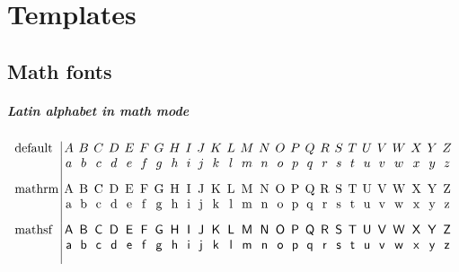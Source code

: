 \chapter{Templates}

\section{Math fonts}
\paragraph*{Latin alphabet in math mode}
\begin{align*}
 \arraycolsep=2pt
 \begin{array}{l|cccccccccccccccccccccccccc}
  \text{default} &
  A & B & C & D & E & F & G & H & I & J & K & L & M & N & O & P & Q & R & S & T & U & V & W & X & Y & Z \\
  \text{} &
  a & b & c & d & e & f & g & h & i & j & k & l & m & n & o & p & q & r & s & t & u & v & w & x & y & z \\[2ex]
  \text{mathrm} &
  \mathrm{A} & \mathrm{B} & \mathrm{C} & \mathrm{D} & \mathrm{E} & \mathrm{F} & \mathrm{G} & \mathrm{H} & \mathrm{I} & \mathrm{J} & \mathrm{K} & \mathrm{L} & \mathrm{M} & \mathrm{N} & \mathrm{O} & \mathrm{P} & \mathrm{Q} & \mathrm{R} & \mathrm{S} & \mathrm{T} & \mathrm{U} & \mathrm{V} & \mathrm{W} & \mathrm{X} & \mathrm{Y} & \mathrm{Z} \\
  \text{} &
  \mathrm{a} & \mathrm{b} & \mathrm{c} & \mathrm{d} & \mathrm{e} & \mathrm{f} & \mathrm{g} & \mathrm{h} & \mathrm{i} & \mathrm{j} & \mathrm{k} & \mathrm{l} & \mathrm{m} & \mathrm{n} & \mathrm{o} & \mathrm{p} & \mathrm{q} & \mathrm{r} & \mathrm{s} & \mathrm{t} & \mathrm{u} & \mathrm{v} & \mathrm{w} & \mathrm{x} & \mathrm{y} & \mathrm{z} \\[2ex]
  \text{mathsf} &
  \mathsf{A} & \mathsf{B} & \mathsf{C} & \mathsf{D} & \mathsf{E} & \mathsf{F} & \mathsf{G} & \mathsf{H} & \mathsf{I} & \mathsf{J} & \mathsf{K} & \mathsf{L} & \mathsf{M} & \mathsf{N} & \mathsf{O} & \mathsf{P} & \mathsf{Q} & \mathsf{R} & \mathsf{S} & \mathsf{T} & \mathsf{U} & \mathsf{V} & \mathsf{W} & \mathsf{X} & \mathsf{Y} & \mathsf{Z} \\
  \text{} &
  \mathsf{a} & \mathsf{b} & \mathsf{c} & \mathsf{d} & \mathsf{e} & \mathsf{f} & \mathsf{g} & \mathsf{h} & \mathsf{i} & \mathsf{j} & \mathsf{k} & \mathsf{l} & \mathsf{m} & \mathsf{n} & \mathsf{o} & \mathsf{p} & \mathsf{q} & \mathsf{r} & \mathsf{s} & \mathsf{t} & \mathsf{u} & \mathsf{v} & \mathsf{w} & \mathsf{x} & \mathsf{y} & \mathsf{z} \\[2ex]

\end{array}
\end{align*}
